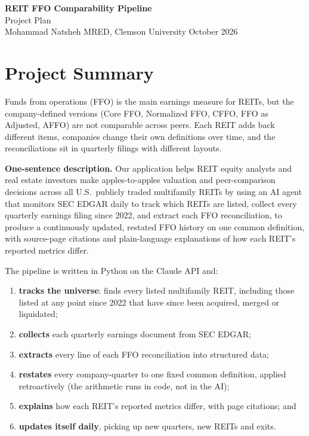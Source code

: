 \documentclass[11pt]{article}
\begin{document}
\begin{center}
  {\LARGE\bfseries REIT FFO Comparability Pipeline}\\[4pt]
  {\large Project Plan}\\[8pt]
  Mohammad Natsheh \quad\textbar\quad MRED, Clemson University \quad\textbar\quad October 2026
\end{center}

\section{Project Summary}

Funds from operations (FFO) is the main earnings measure for REITs, but the
company-defined versions (Core FFO, Normalized FFO, CFFO, FFO as Adjusted,
AFFO) are not comparable across peers. Each REIT adds back different items,
companies change their own definitions over time, and the reconciliations sit
in quarterly filings with different layouts.

\textbf{One-sentence description.} Our application helps REIT equity analysts
and real estate investors make apples-to-apples valuation and peer-comparison
decisions across all U.S.\ publicly traded multifamily REITs by using an AI
agent that monitors SEC EDGAR daily to track which REITs are listed, collect
every quarterly earnings filing since 2022, and extract each FFO
reconciliation, to produce a continuously updated, restated FFO history on one
common definition, with source-page citations and plain-language explanations
of how each REIT's reported metrics differ.

The pipeline is written in Python on the Claude API and:
\begin{enumerate}[itemsep=1pt]
  \item \textbf{tracks the universe}: finds every listed multifamily REIT,
        including those listed at any point since 2022 that have since been
        acquired, merged or liquidated;
  \item \textbf{collects} each quarterly earnings document from SEC EDGAR;
  \item \textbf{extracts} every line of each FFO reconciliation into structured data;
  \item \textbf{restates} every company-quarter to one fixed common definition,
        applied retroactively (the arithmetic runs in code, not in the AI);
  \item \textbf{explains} how each REIT's reported metrics differ, with page citations; and
  \item \textbf{updates itself daily}, picking up new quarters, new REITs and exits.
\end{enumerate}
\end{document}
